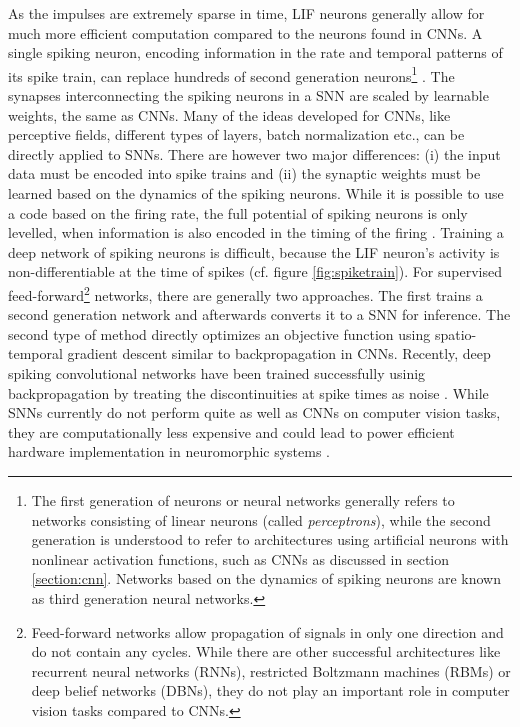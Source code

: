 As the impulses are extremely sparse in time, LIF neurons generally allow for much more efficient computation compared to the neurons found in CNNs. A single spiking neuron, encoding information in the rate and temporal patterns of its spike train, can replace hundreds of second generation neurons\footnote{The first generation of neurons or neural networks generally refers to networks consisting of linear neurons (called \emph{perceptrons}), while the second generation is understood to refer to architectures using artificial neurons with nonlinear activation functions, such as CNNs as discussed in section \ref{section:cnn}. Networks based on the dynamics of spiking neurons are known as third generation neural networks.} \cite{gerstner2002spiking,maass1997networks,rieke1999spikes}. The synapses interconnecting the spiking neurons in a SNN are scaled by learnable weights, the same as CNNs. Many of the ideas developed for CNNs, like perceptive fields, different types of layers, batch normalization etc., can be directly applied to SNNs. There are however two major differences: (i) the input data must be encoded into spike trains and (ii) the synaptic weights must be learned based on the dynamics of the spiking neurons. While it is possible to use a code based on the firing rate, the full potential of spiking neurons is only levelled, when information is also encoded in the timing of the firing \cite{bohte2002unsupervised,bohte2004evidence,hopfield1995pattern}. Training a deep network of spiking neurons is difficult, because the LIF neuron's activity is non-differentiable at the time of spikes (cf. figure \ref{fig:spiketrain}). For supervised feed-forward\footnote{Feed-forward networks allow propagation of signals in only one direction and do not contain any cycles. While there are other successful architectures like recurrent neural networks (RNNs), restricted Boltzmann machines (RBMs) or deep belief networks (DBNs), they do not play an important role in computer vision tasks compared to CNNs.} networks, there are generally two approaches. The first trains a second generation network and afterwards converts it to a SNN for inference. The second type of method directly optimizes an objective function using spatio-temporal gradient descent similar to backpropagation in CNNs. Recently, deep spiking convolutional networks have been trained successfully usinig backpropagation by treating the discontinuities at spike times as noise \cite{10.3389/fnins.2016.00508, panda2016unsupervised}. While SNNs currently do not perform quite as well as CNNs on computer vision tasks, they are computationally less expensive and could lead to power efficient hardware implementation in neuromorphic systems \cite{hopkins2018spiking}.
